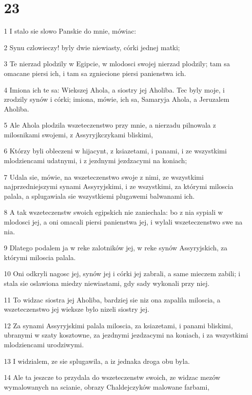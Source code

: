 \chapter{23}

\par 1 I stalo sie slowo Panskie do mnie, mówiac:
\par 2 Synu czlowieczy! byly dwie niewiasty, córki jednej matki;
\par 3 Te nierzad plodzily w Egipcie, w mlodosci swojej nierzad plodzily; tam sa omacane piersi ich, i tam sa zgniecione piersi panienstwa ich.
\par 4 Imiona ich te sa: Wiekszej Ahola, a siostry jej Aholiba. Tec byly moje, i zrodzily synów i córki; imiona, mówie, ich sa, Samaryja Ahola, a Jeruzalem Aholiba.
\par 5 Ale Ahola plodzila wszeteczenstwo przy mnie, a nierzadu pilnowala z milosnikami swojemi, z Assyryjkczykami bliskimi,
\par 6 Którzy byli obleczeni w hijacynt, z ksiazetami, i panami, i ze wszystkimi mlodziencami udatnymi, i z jezdnymi jezdzacymi na koniach;
\par 7 Udala sie, mówie, na wszeteczenstwo swoje z nimi, ze wszystkimi najprzedniejszymi synami Assyryjskimi, i ze wszystkimi, za którymi miloscia palala, a splugawiala sie wszystkiemi plugawemi balwanami ich.
\par 8 A tak wszeteczenstw swoich egipskich nie zaniechala: bo z nia sypiali w mlodosci jej, a oni omacali piersi panienstwa jej, i wylali wszeteczenstwo swe na nia.
\par 9 Dlatego podalem ja w reke zalotników jej, w reke synów Assyryjskich, za którymi miloscia palala.
\par 10 Oni odkryli nagosc jej, synów jej i córki jej zabrali, a same mieczem zabili; i stala sie oslawiona miedzy niewiastami, gdy sady wykonali przy niej.
\par 11 To widzac siostra jej Aholiba, bardziej sie niz ona zapalila miloscia, a wszeteczenstwo jej wieksze bylo nizeli siostry jej.
\par 12 Za synami Assyryjskimi palala miloscia, za ksiazetami, i panami bliskimi, ubranymi w szaty kosztowne, za jezdnymi jezdzacymi na koniach, i za wszystkimi mlodziencami urodziwymi.
\par 13 I widzialem, ze sie splugawila, a iz jednaka droga obu byla.
\par 14 Ale ta jeszcze to przydala do wszeteczenstw swoich, ze widzac mezów wymalowanych na scianie, obrazy Chaldejczyków malowane farbami,
